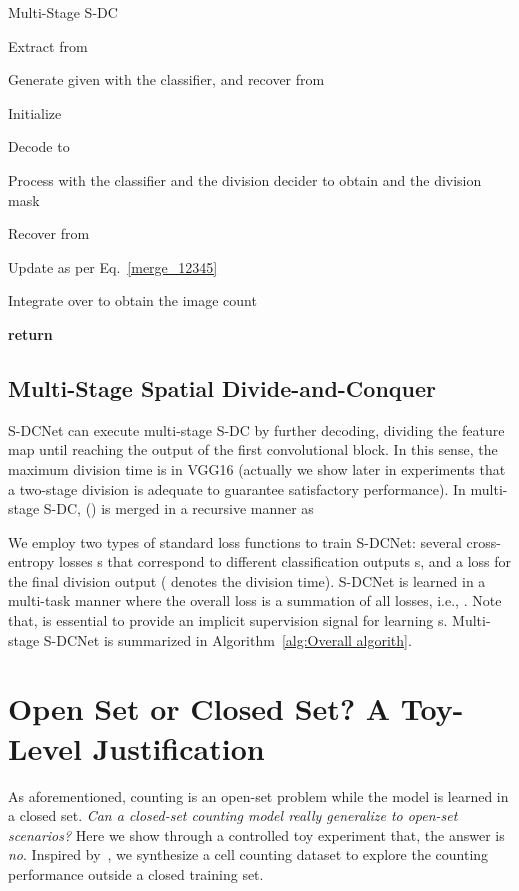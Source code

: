 \documentclass[10pt,twocolumn,letterpaper]{article}
\begin{document}
	\iffalse
	They are defined as eq.~\ref{Cross_Entropy_Loss} and ~\ref{L1Loss} separately.
	
	
	
	
	\fi
	
	\begin{algorithm}[!t] \small
		\caption{ Multi-Stage S-DC}
		\label{alg:Overall algorith}
		\LinesNumbered
		
		Extract  from \;
		
		Generate  given  with the classifier, and recover  from \;



		Initialize \;
		
		{
			Decode  to \;
			
			Process  with the classifier and the division decider to obtain  and the division mask \;
			
Recover  from \;
			
			Update  as per Eq.~\ref{merge_12345} \;  	
		}
		
Integrate over  to obtain the image count \;
		
		
\textbf{return} 
	\end{algorithm}
	
	\subsection{Multi-Stage Spatial Divide-and-Conquer}
	
	S-DCNet can execute multi-stage S-DC by further decoding, dividing the feature map until reaching the output of the first convolutional block. In this sense, the maximum division time is  in VGG16 (actually we show later in experiments that a two-stage division is adequate to guarantee satisfactory performance). In multi-stage S-DC,  () is merged in a recursive manner as 
	
	
We employ two types of standard loss functions to train S-DCNet: several cross-entropy losses s that correspond to different classification outputs s, and a  loss  for the final division output  ( denotes the division time). S-DCNet is learned in a multi-task manner where the overall loss  is a summation of all losses, i.e., \mbox{}. Note that,  is essential to provide an implicit supervision signal for learning s. Multi-stage S-DCNet is summarized in Algorithm~\ref{alg:Overall algorith}.


	\section{Open Set or Closed Set? A Toy-Level Justification}
As aforementioned, counting is an open-set problem while the model is learned in a closed set. \emph{Can a closed-set counting model really generalize to open-set scenarios?} Here we show through a controlled toy experiment that, the answer is \textit{no}. Inspired by~\cite{vlaz2010denlearn}, we synthesize a cell counting dataset to explore the counting performance outside a closed training set.
	
\end{document}
